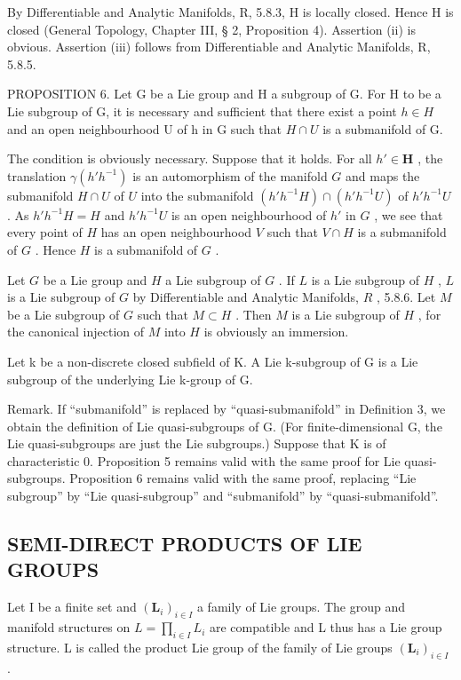 By Differentiable and Analytic Manifolds, R, 5.8.3, H is locally closed. Hence H is closed (General Topology, Chapter III, § 2, Proposition 4). Assertion (ii) is obvious. Assertion (iii) follows from Differentiable and Analytic Manifolds, R, 5.8.5.

PROPOSITION 6. Let G be a Lie group and H a subgroup of G. For H to be a Lie subgroup of G, it is necessary and sufficient that there exist a point \(h \in H\) and an open neighbourhood U of h in G such that \(H \cap U\) is a submanifold of G.

The condition is obviously necessary. Suppose that it holds. For all \(h' \in \mathbf{H}\) , the translation \(\gamma (h'h^{-1})\) is an automorphism of the manifold \(G\) and maps the submanifold \(H \cap U\) of \(U\) into the submanifold \((h'h^{-1}H) \cap (h'h^{-1}U)\) of \(h'h^{-1}U\) . As \(h'h^{-1}H = H\) and \(h'h^{-1}U\) is an open neighbourhood of \(h'\) in \(G\) , we see that every point of \(H\) has an open neighbourhood \(V\) such that \(V \cap H\) is a submanifold of \(G\) . Hence \(H\) is a submanifold of \(G\) .

Let \(G\) be a Lie group and \(H\) a Lie subgroup of \(G\) . If \(L\) is a Lie subgroup of \(H\) , \(L\) is a Lie subgroup of \(G\) by Differentiable and Analytic Manifolds, \(R\) , 5.8.6. Let \(M\) be a Lie subgroup of \(G\) such that \(M \subset H\) . Then \(M\) is a Lie subgroup of \(H\) , for the canonical injection of \(M\) into \(H\) is obviously an immersion.

Let k be a non-discrete closed subfield of K. A Lie k-subgroup of G is a Lie subgroup of the underlying Lie k-group of G.

Remark. If ``submanifold'' is replaced by ``quasi-submanifold'' in Definition 3, we obtain the definition of Lie quasi-subgroups of G. (For finite-dimensional G, the Lie quasi-subgroups are just the Lie subgroups.) Suppose that K is of characteristic 0. Proposition 5 remains valid with the same proof for Lie quasi-subgroups. Proposition 6 remains valid with the same proof, replacing ``Lie subgroup'' by ``Lie quasi-subgroup'' and ``submanifold'' by ``quasi-submanifold''.

\subsection{SEMI-DIRECT PRODUCTS OF LIE GROUPS}

Let I be a finite set and \((\mathbf{L}_{i})_{i\in I}\) a family of Lie groups. The group and manifold structures on \(L=\prod_{i\in I}L_{i}\) are compatible and L thus has a Lie group structure. L is called the product Lie group of the family of Lie groups \((\mathbf{L}_{i})_{i\in I}\) .

